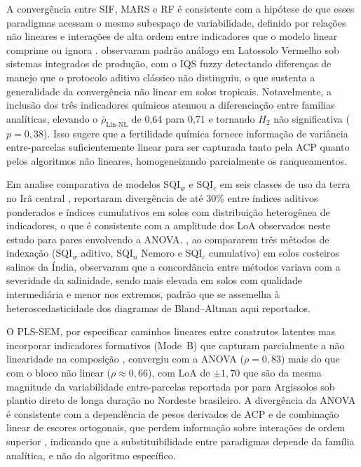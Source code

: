 \documentclass[pdflatex,sn-basic]{sn-jnl}%
\begin{document}
A convergência entre SIF, MARS e RF é consistente com a hipótese de que esses paradigmas acessam o mesmo subespaço de variabilidade, definido por relações não lineares e interações de alta ordem entre indicadores que o modelo linear comprime ou ignora \cite{Zeraatpisheh2020,Wadoux2020}. \cite{DosSantos2021} observaram padrão análogo em Latossolo Vermelho sob sistemas integrados de produção, com o IQS fuzzy detectando diferenças de manejo que o protocolo aditivo clássico não distinguiu, o que sustenta a generalidade da convergência não linear em solos tropicais. Notavelmente, a inclusão dos três indicadores químicos atenuou a diferenciação entre famílias analíticas, elevando o $\bar{\rho}_{\text{Lin-NL}}$ de 0,64 para 0,71 e tornando $H_2$ não significativa ($p = 0{,}38$). Isso sugere que a fertilidade química fornece informação de variância entre-parcelas suficientemente linear para ser capturada tanto pela ACP quanto pelos algoritmos não lineares, homogeneizando parcialmente os ranqueamentos. 

Em analise comparativa de modelos SQI$_w$ e SQI$_c$ em seis classes de uso da terra no Irã central \cite{Emami2024}, reportaram divergência de até 30\% entre índices aditivos ponderados e índices cumulativos em solos com distribuição heterogênea de indicadores, o que é consistente com a amplitude dos LoA observados neste estudo para pares envolvendo a ANOVA.  \cite{Mahajan2021}, ao compararem três métodos de indexação (SQI$_w$ aditivo, SQI$_n$ Nemoro e SQI$_c$ cumulativo) em solos costeiros salinos da Índia, observaram que a concordância entre métodos variava com a severidade da salinidade, sendo mais elevada em solos com qualidade intermediária e menor nos extremos, padrão que se assemelha à heteroscedasticidade dos diagramas de Bland--Altman aqui reportados. 

O PLS-SEM, por especificar caminhos lineares entre construtos latentes mas incorporar indicadores formativos (Mode~B) que capturam parcialmente a não linearidade na composição \cite{Diamantopoulos2008}, convergiu com a ANOVA ($\rho = 0{,}83$) mais do que com o bloco não linear ($\rho \approx 0{,}66$), com LoA de $\pm 1{,}70$ que são da mesma magnitude da variabilidade entre-parcelas reportada por \cite{Oliveira2020} para Argissolos sob plantio direto de longa duração no Nordeste brasileiro. A divergência da ANOVA é consistente com a dependência de pesos derivados de ACP e de combinação linear de escores ortogonais, que perdem informação sobre interações de ordem superior \cite{Andrews2002,Bünemann2018}, indicando que a substituibilidade entre paradigmas depende da família analítica, e não do algoritmo específico.
\end{document}
